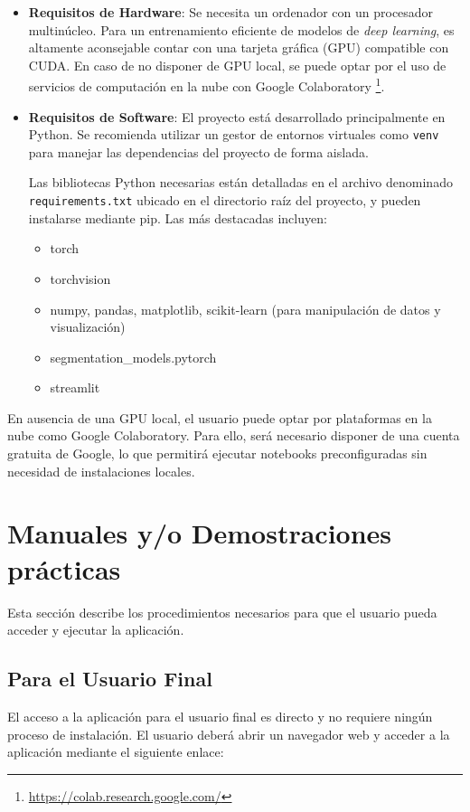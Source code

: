 \begin{itemize}
    \item \textbf{Requisitos de Hardware}: Se necesita un ordenador con un procesador multinúcleo. Para un entrenamiento eficiente de modelos de \textit{deep learning}, es altamente aconsejable contar con una tarjeta gráfica (GPU) compatible con CUDA. En caso de no disponer de GPU local, se puede optar por el uso de servicios de computación en la nube con Google Colaboratory \footnote{\url{https://colab.research.google.com/}}.
    \item \textbf{Requisitos de Software}: El proyecto está desarrollado principalmente en Python. Se recomienda utilizar un gestor de entornos virtuales como \texttt{venv} para manejar las dependencias del proyecto de forma aislada. 
    
    Las bibliotecas Python necesarias están detalladas en el archivo denominado \texttt{requirements.txt} ubicado en el directorio raíz del proyecto, y pueden instalarse mediante pip. Las más destacadas incluyen:
    \begin{itemize}
        \item torch
        \item torchvision
        \item numpy, pandas, matplotlib, scikit-learn (para manipulación de datos y visualización)
        \item segmentation\_models.pytorch
        \item streamlit
    \end{itemize}
\end{itemize}
En ausencia de una GPU local, el usuario puede optar por plataformas en la nube como Google Colaboratory. Para ello, será necesario disponer de una cuenta gratuita de Google, lo que permitirá ejecutar notebooks preconfiguradas sin necesidad de instalaciones locales.


\section{Manuales y/o Demostraciones prácticas}
Esta sección describe los procedimientos necesarios para que el usuario pueda acceder y ejecutar la aplicación. 
\subsection{Para el Usuario Final}
El acceso a la aplicación para el usuario final es directo y no requiere ningún proceso de instalación. El usuario deberá abrir un navegador web y acceder a la aplicación mediante el siguiente enlace: 


